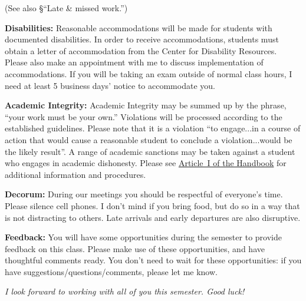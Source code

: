 \documentclass[11pt]{amsart}
\begin{document}
(See also \S ``Late \& missed work.'')

\vspace{10pt}
\noindent\textbf{Disabilities:}  Reasonable accommodations will be made for students with documented disabilities. In order to receive accommodations, students must obtain a letter of accommodation from the Center for Disability Resources.  Please also make an appointment with me to discuss implementation of accommodations.  If you will be taking an exam outside of normal class hours, I need at least 5 business days' notice to accommodate you.

\vspace{10pt}
\noindent\textbf{Academic Integrity:}
Academic Integrity may be summed up by the phrase, ``your work
must be your own.''  Violations will be processed according to the established guidelines. Please note that it is a violation ``to engage...in a course of action that would cause a reasonable student to conclude a violation...would be the likely result''.  
A range of academic sanctions may be taken against a student who engages in academic dishonesty.
Please see \href{https://web.iit.edu/student-affairs/handbook/fine-print/code-academic-honesty}{Article~I of the Handbook} for additional information and procedures.

\vspace{10pt}
\noindent \textbf{Decorum:}  
During our meetings you should be respectful of everyone's time.  Please silence cell phones.  I don't mind if you bring food, but do so in a way that is not distracting to others.  Late arrivals and early departures are also disruptive.

\vspace{10pt}
\noindent \textbf{Feedback:}  You will have some opportunities during the semester to provide feedback on this class.  Please make use of these opportunities, and have thoughtful comments ready.  
You don't need to wait for these opportunities: if you have suggestions/questions/comments, please let me know.

\vspace{20pt}

\emph{I look forward to working with all of you this semester.  Good luck!}
\end{document}
